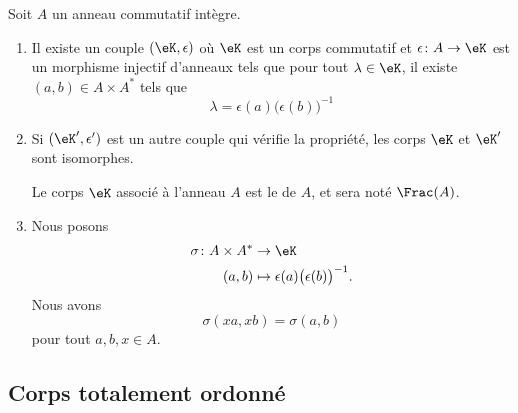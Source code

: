 \begin{theoremDef}     \label{ThogbhWgo}
    Soit \( A\) un anneau commutatif intègre.

    \begin{enumerate}
        \item
    Il existe un couple \( (\eK,\epsilon)\) où \( \eK\) est un corps commutatif et \( \epsilon\colon A\to \eK\) est un morphisme injectif d'anneaux tels que pour tout \( \lambda\in\eK\), il existe \( (a,b)\in A\times A^*\) tels que
    \begin{equation}
        \lambda=\epsilon(a)\big( \epsilon(b) \big)^{-1}
    \end{equation}
\item
    Si \( (\eK',\epsilon')\) est un autre couple qui vérifie la propriété, les corps \( \eK\) et \( \eK'\) sont isomorphes.

    Le corps \( \eK\) associé à l'anneau \( A\) est le  de \( A\), et sera noté \( \Frac(A)\).

\item
    Nous posons
    \begin{equation}
        \begin{aligned}
            \sigma\colon A\times A^*&\to \eK \\
            (a,b)&\mapsto \epsilon(a)\big( \epsilon(b) \big)^{-1}. 
        \end{aligned}
    \end{equation}
    Nous avons
    \begin{equation}
        \sigma(xa, xb)=\sigma(a,b)
    \end{equation}
    pour tout \( a,b,x\in A\).
    \end{enumerate}
\end{theoremDef}

\subsection{Corps totalement ordonné}

